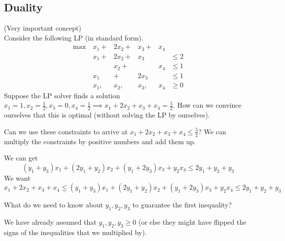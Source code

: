 \documentclass[12 pt]{article}
\begin{document}
        \subsection{Duality}
        (Very important concept)
        \\ Consider the following LP (in standard form).
        $$\begin{matrix}
          \max \ &x_1 + &2x_2 + &x_3 + &x_4 &
          \\ &x_1 + &2x_2 + &x_3 && \leq 2
          \\ &&x_2 + &&x_4 &\leq 1
          \\ &x_1 &+&2x_3 && \leq 1
          \\ &x_1,&x_2,&x_3, &x_4 &\geq 0
        \end{matrix}$$
        Suppose the LP solver finds a solution $x_1 = 1, x_2 =
        \frac{1}{2}, x_3 = 0, x_4 = \frac{1}{2} \implies x_1 +2x_2 +
        x_3 + x_4 = \frac{5}{2}$. How can we convince
        ourselves that this is optimal (without solving the LP by
        ourselves).

        Can we use these constraints to arrive at $x_1 + 2x_2 + x_3 +
        x_4 \leq \frac{5}{2}$? We can multiply the constraints by
        positive numbers and add them up.

        We can get
          $$(y_1 + y_3)x_1 + (2y_1 + y_2)x_2 + (y_1 + 2y_3)x_3 + y_2
          x_4 \leq 2y_1 + y_2 + y_3$$
          We want
          $$x_1 + 2x_2 + x_3 + x_4 \underline{\leq} (y_1 + y_3)x_1 + (2y_1 +
          y_2)x_2 + (y_1 + 2y_3)x_3 + y_2x_4 \leq 2y_1 + y_2 + y_3$$

          What do we need to know about $y_1, y_2, y_3$ to guarantee
          the first inequality?

          We have already assumed that $y_1,y_2,y_3 \geq 0$ (or else they
          might have flipped the signs of the inequalities that we
          multiplied by).
\end{document}
